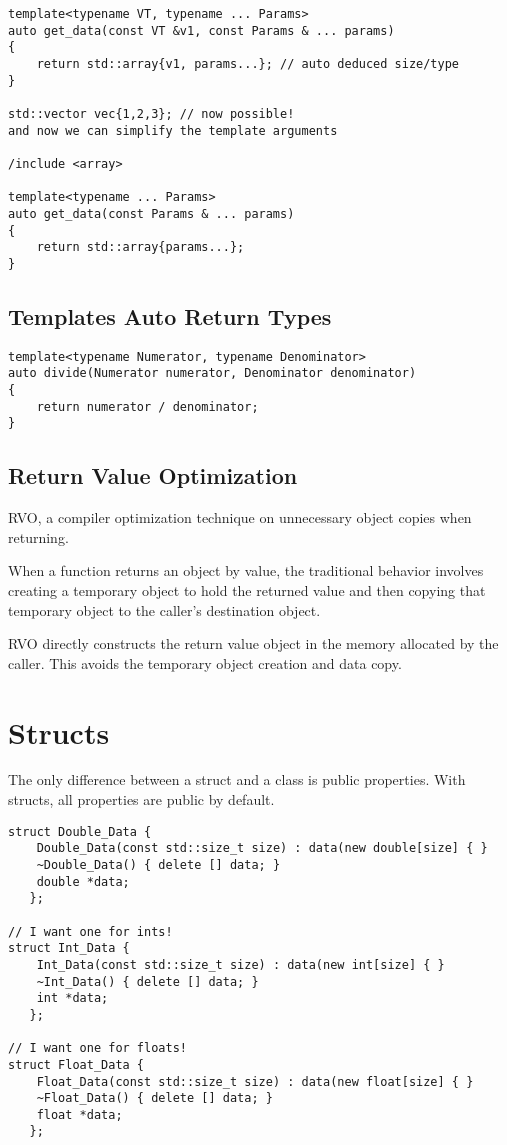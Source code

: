 \documentclass[openany]{report}
\begin{document}
\begin{verbatim}
template<typename VT, typename ... Params>
auto get_data(const VT &v1, const Params & ... params)
{
    return std::array{v1, params...}; // auto deduced size/type
}

std::vector vec{1,2,3}; // now possible! 
and now we can simplify the template arguments

/include <array>

template<typename ... Params>
auto get_data(const Params & ... params)
{
    return std::array{params...};
}
\end{verbatim}

\subsection{Templates Auto Return Types}

\begin{verbatim}
template<typename Numerator, typename Denominator>
auto divide(Numerator numerator, Denominator denominator)
{
    return numerator / denominator;
}
\end{verbatim}


\subsection{Return Value Optimization}
RVO, a compiler optimization technique on 
unnecessary object copies when returning.


When a function returns an object by value,
the traditional behavior involves creating a temporary object to hold 
the returned value and then copying that temporary object to the caller's destination object.


RVO directly constructs the return value object in the memory allocated by the caller.
This avoids the temporary object creation and data copy.

\section{Structs}

The only difference between a struct and a class is public properties. With
structs, all properties are public by default.

\begin{verbatim}
struct Double_Data {
    Double_Data(const std::size_t size) : data(new double[size] { }
    ~Double_Data() { delete [] data; }
    double *data;
   };

// I want one for ints!
struct Int_Data {
    Int_Data(const std::size_t size) : data(new int[size] { }
    ~Int_Data() { delete [] data; }
    int *data;
   };

// I want one for floats!
struct Float_Data {
    Float_Data(const std::size_t size) : data(new float[size] { }
    ~Float_Data() { delete [] data; }
    float *data;
   };
\end{verbatim}
\end{document}
